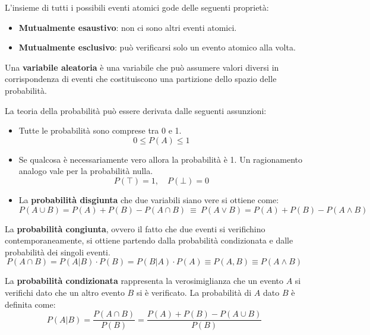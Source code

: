 L'insieme di tutti i possibili eventi atomici gode delle seguenti proprietà:
\begin{itemize}
    \item \textbf{Mutualmente esaustivo}: non ci sono altri eventi atomici.
    \item \textbf{Mutualmente esclusivo}: può verificarsi solo un evento atomico
          alla volta.
\end{itemize}
\begin{definizione}
    Una \textbf{variabile aleatoria} è una variabile che può assumere valori
    diversi in corrispondenza di eventi che costituiscono una partizione dello
    spazio delle probabilità.
\end{definizione}
La teoria della probabilità può essere derivata dalle seguenti assunzioni:
\begin{itemize}
    \item Tutte le probabilità sono comprese tra 0 e 1.
          \begin{equation}
              0 \leq P(A) \leq 1
          \end{equation}
    \item Se qualcosa è necessariamente vero allora la probabilità è 1. Un
          ragionamento analogo vale per la probabilità nulla.
          \begin{equation}
              P(\top) = 1, \quad P(\bot) = 0
          \end{equation}
    \item La \textbf{probabilità disgiunta} che due variabili siano vere si
          ottiene come:
          \begin{equation}
              P(A \cup B) = P(A) + P(B) - P(A \cap B) \ \equiv \ P(A \lor B) =
              P(A) + P(B) - P(A \land B)
          \end{equation}
\end{itemize}
\begin{definizione}
    La \textbf{probabilità congiunta}, ovvero il fatto che due eventi si
    verifichino contemporaneamente, si ottiene partendo dalla probabilità
    condizionata e dalle probabilità dei singoli eventi.
    \begin{equation}
        P(A \cap B) = P(A|B) \cdot P(B) = P(B|A) \cdot P(A) \equiv P(A, B) \equiv
        P(A \land B)
    \end{equation}
\end{definizione}
\begin{definizione}
    La \textbf{probabilità condizionata} rappresenta la verosimiglianza che un
    evento $A$ si verifichi dato che un altro evento $B$ si è verificato.
    La probabilità di $A$ dato $B$ è definita come:
    \begin{equation}
        P(A|B) = \frac{P(A \cap B)}{P(B)} = \frac{P(A) + P(B) - P(A \cup B)}{P(B)}
    \end{equation}
\end{definizione}
